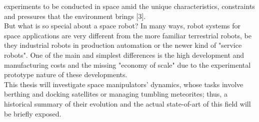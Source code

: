 \documentclass[a4paper,12pt,oneside]{report}
\begin{document}
experiments to be conducted in space amid the unique characteristics, constraints and pressures that the environment brings [3].\\
But what is so special about a space robot? In many ways, robot systems for space applications are very different from the more familiar terrestrial robots, be they industrial robots in production automation or the newer kind of "service robots". One of the main and simplest differences is the high development and manufacturing costs and the missing "economy of scale" due to the experimental prototype nature of these developments.\\
This thesis will investigate space manipulators' dynamics, whose tasks involve berthing and docking satellites or managing tumbling meteorites; thus, a historical summary of their evolution and the actual state-of-art of this field will be briefly exposed.
\end{document}
